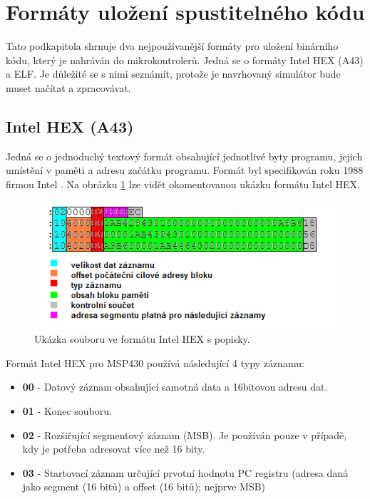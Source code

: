 \section{Formáty uložení spustitelného kódu}

Tato podkapitola shrnuje dva nejpoužívanější formáty pro uložení binárního kódu, který je nahráván do mikrokontrolerů. Jedná se o formáty Intel HEX (A43) a ELF. Je důležité se s nimi seznámit, protože je navrhovaný simulátor bude muset načítat a zpracovávat.

\subsection{Intel HEX (A43)}

Jedná se o jednoduchý textový formát obsahující jednotlivé byty programu, jejich umístění v paměti a adresu začátku programu. Formát byl specifikován roku 1988 firmou Intel \cite{intelhex}. Na obrázku \ref{fig:intelhex} lze vidět okomentovanou ukázku formátu Intel HEX.

\begin{figure}[ht]
\centering
\includegraphics[trim=0cm 0cm 0cm 0cm, scale=0.7]{fig/intelhex}
\caption{Ukázka souboru ve formátu Intel HEX s popisky.}
\label{fig:intelhex}
\end{figure}

Formát Intel HEX pro MSP430 používá následující 4 typy záznamu:

\begin{itemize}
\item \textbf{00} - Datový záznam obsahující samotná data a 16bitovou adresu dat.
\item \textbf{01} - Konec souboru.
\item \textbf{02} - Rozšiřující segmentový záznam (MSB). Je používán pouze v případě, kdy je potřeba adresovat více než 16 bity.
\item \textbf{03} - Startovací záznam určující prvotní hodnotu PC registru (adresa daná jako segment (16 bitů) a offset (16 bitů); nejprve MSB)
\end{itemize}

